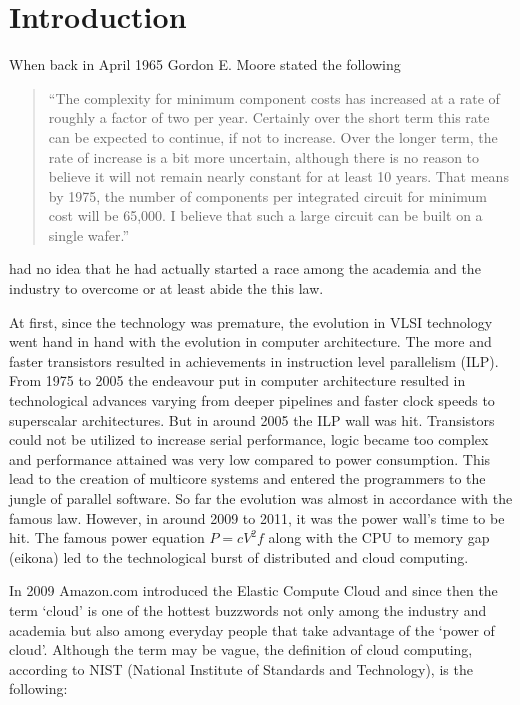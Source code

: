\chapter{Introduction}\label{ch:intro}

When back in April 1965 Gordon E. Moore stated the following 
\begin{quotation}
    ``The complexity for minimum component costs has increased at a rate of 
    roughly a factor of two per year. Certainly over the short term this rate 
    can be expected to continue, if not to increase. Over the longer term, the 
    rate of increase is a bit more uncertain, although there is no reason to 
    believe it will not remain nearly constant for at least 10 years. That 
    means by 1975, the number of components per integrated circuit for minimum 
    cost will be 65,000. I believe that such a large circuit can be built on a 
    single wafer.''\cite{Moore}
\end{quotation}

had no idea that he had actually started a race among the academia and the
industry to overcome or at least abide the this law.

At first, since the technology was premature, the evolution in VLSI technology
went hand in hand with the evolution in computer architecture. The more and
faster transistors resulted in achievements in instruction level parallelism
(ILP). From 1975 to 2005 the endeavour put in computer architecture resulted in 
technological advances varying from deeper pipelines and faster clock speeds to
superscalar architectures. But in around 2005 the ILP wall was hit. Transistors
could not be utilized to increase serial performance, logic became too complex
and performance attained was very low compared to power consumption. This lead
to the creation of multicore systems and entered the programmers to the jungle
of parallel software. So far the evolution was almost in accordance with the
famous law. However, in around 2009 to 2011, it was the power wall's time to be
hit. The famous power equation $P=cV^2f$ along with the CPU to memory gap
(eikona) led to the technological burst of distributed and cloud computing.

In 2009 Amazon.com introduced the Elastic Compute Cloud and since then the term
`cloud' is one of the hottest buzzwords not only among the industry and academia
but also among everyday people that take advantage of the `power of cloud'.
Although the term may be vague, the definition of cloud computing, according to
NIST (National Institute of Standards and Technology), is the following:


